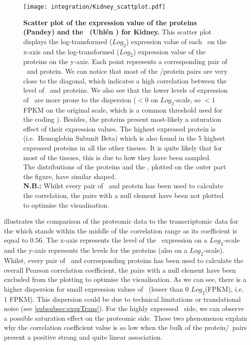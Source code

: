 \begin{figure}[!htbp]
    \texttt{[image: integration/Kidney\_scattplot.pdf]}\centering
    \caption[Scatter plot of the expression value of the proteins (Pandey)
    and the \mRNAs\ (Uhlén \etal) for Kidney]
    {\label{fig:ScatKid}\textbf{Scatter plot of the expression value of the
    proteins (Pandey) and the \mRNAs\ (Uhlén \etal) for Kidney.}
    This scatter plot displays the
    log-transformed ($Log_{2}$) expression value of
    each \mRNA\ on the x-axis and the log-transformed ($Log_{2}$)
    expression value of the proteins on the
    y-axis. Each point represents a corresponding pair of \mRNA\ and protein.
    We can notice that most of the \mRNA/protein pairs are very close to
    the diagonal, which indicates a high correlation between the level
    of \mRNAs\ and proteins. We also see that the lower levels of expression of
    \mRNAs\ are more prone to the dispersion ($<0$ on $Log_{2}$-scale, so $<1$
    \gls{FPKM} on the original scale, which is a common threshold used for the
    coding \mRNAs). Besides, the proteins present most-likely a
    saturation effect of their expression values. The highest expressed protein
    is 
    (i.e.\ Hemoglobin Subunit Beta) which is also found in the 5 highest
    expressed proteins in all the other tissues. It is quite likely that for
    most of the tissues, this is due to how they have been sampled.
    \\The distributions of the proteins and the \mRNAs, plotted on the outer part
    the figure, have similar shaped.\\
    \textbf{N.B.:} Whilst every pair of \mRNA\ and protein has been used to
    calculate the correlation, the pairs with a null element have been not plotted
    to optimise the visualisation.}
\end{figure}

 illustrates the comparison of the proteomic data to the
transcriptomic data for the  which stands within the middle of the
correlation range as its coefficient is equal to $0.56$.
The x-axis represents the level of the \mRNAs\
expression on a $Log_{2}$-scale and the y-axis represents the levels for the
proteins (also on a $Log_{2}$-scale). Whilst, every pair of \mRNA\ and
corresponding proteins has been used to calculate the overall Pearson correlation
coefficient, the pairs with a null element have been excluded from the plotting
to optimise the visualisation. As we can see, there is a higher dispersion for
small expression values of \mRNAs\ (lesser than $0$ $Log_{2}$(FPKM), i.e.\
$1$ FPKM). This dispersion could be due to technical limitations or translational
noise (see \cref{subsubsec:exprTrans}). For the highly expressed \mRNAs\ side,
we can observe a possible saturation effect on the proteomic side. These two
phenomenon explain why the correlation coefficient value is so low when the
bulk of the protein/\mRNA\ pairs present a positive strong and quite linear
association.

